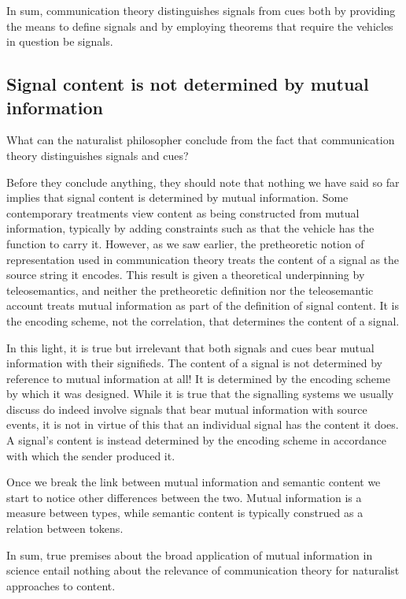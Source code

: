 In sum, communication theory distinguishes signals from cues both by providing the means to define signals and by employing theorems that require the vehicles in question be signals.

\subsection{Signal content is not determined by mutual information}

What can the naturalist philosopher conclude from the fact that communication theory distinguishes signals and cues?

Before they conclude anything, they should note that nothing we have said so far implies that signal content is determined by mutual information.
Some contemporary treatments view content as being constructed from mutual information, typically by adding constraints such as that the vehicle has the function to carry it.
However, as we saw earlier, the pretheoretic notion of representation used in communication theory treats the content of a signal as the source string it encodes.
This result is given a theoretical underpinning by teleosemantics, and neither the pretheoretic definition nor the teleosemantic account treats mutual information as part of the definition of signal content.
It is the encoding scheme, not the correlation, that determines the content of a signal.

In this light, it is true but irrelevant that both signals and cues bear mutual information with their signifieds. 
The content of a signal is not determined by reference to mutual information at all!
It is determined by the encoding scheme by which it was designed.
While it is true that the signalling systems we usually discuss do indeed involve signals that bear mutual information with source events, it is not in virtue of this that an individual signal has the content it does.
A signal's content is instead determined by the encoding scheme in accordance with which the sender produced it.

Once we break the link between mutual information and semantic content we start to notice other differences between the two.
Mutual information is a measure between types, while semantic content is typically construed as a relation between tokens.

In sum, true premises about the broad application of mutual information in science entail nothing about the relevance of communication theory for naturalist approaches to content.


